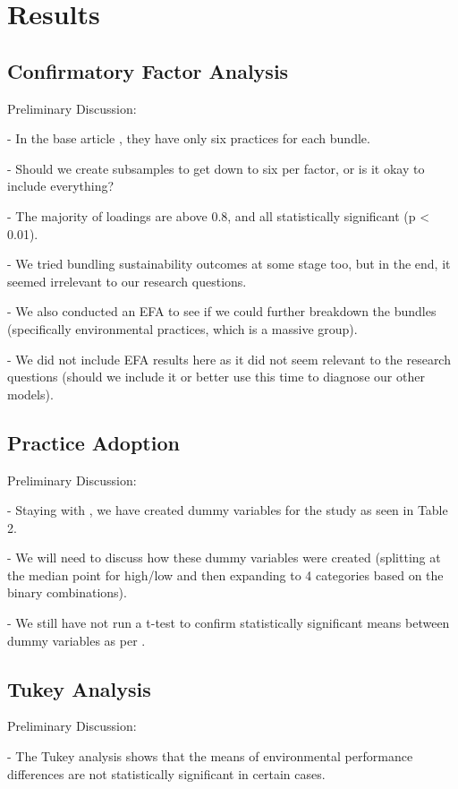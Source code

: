 \section{Results}
\subsection*{Confirmatory Factor Analysis}
Preliminary Discussion:

- In the base article \cite{furlanComplementarityLeanManufacturing2011}, they have only six practices for each bundle.

- Should we create subsamples to get down to six per factor, or is it okay to include everything?

- The majority of loadings are above 0.8, and all statistically significant (p < 0.01).

- We tried bundling sustainability outcomes at some stage too, but in the end, it seemed irrelevant to our research questions.

- We also conducted an EFA to see if we could further breakdown the bundles (specifically environmental practices, which is a massive group).

- We did not include EFA results here as it did not seem relevant to the research questions (should we include it or better use this time to diagnose our other models).


\subsection*{Practice Adoption}
Preliminary Discussion:

- Staying with \cite{furlanComplementarityLeanManufacturing2011}, we have created dummy variables for the study as seen in Table 2.

- We will need to discuss how these dummy variables were created (splitting at the median point for high/low and then expanding to 4 categories based on the binary combinations).

- We still have not run a t-test to confirm statistically significant means between dummy variables as per \cite{furlanComplementarityLeanManufacturing2011}.


\subsection*{Tukey Analysis}
Preliminary Discussion:

- The Tukey analysis shows that the means of environmental performance differences are not statistically significant in certain cases.

